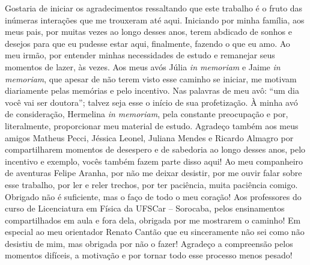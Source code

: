 

\begin{agradecimentos}
  Gostaria de iniciar os agradecimentos ressaltando que este trabalho é o fruto das inúmeras interações que me trouxeram até aqui. Iniciando por minha família, aos meus pais, por muitas vezes ao longo desses anos, terem abdicado de sonhos e desejos para que eu pudesse estar aqui, finalmente, fazendo o que eu amo. Ao meu irmão, por entender minhas necessidades de estudo e remanejar seus momentos de lazer, às vezes. Aos meus avós Júlia \textit{in memoriam} e Jaime \textit{in memoriam}, que apesar de não terem visto esse caminho se iniciar, me motivam diariamente pelas memórias e pelo incentivo. Nas palavras de meu avô: ``um dia você vai ser doutora''; talvez seja esse o início de sua profetização. À minha avó de consideração, Hermelina \textit{in memoriam}, pela constante preocupação e por, literalmente, proporcionar meu material de estudo.
  Agradeço também aos meus amigos Matheus Pecci, Jéssica Leonel, Juliana Mendes e Ricardo Almagro por compartilharem momentos de desespero e de sabedoria ao longo desses anos, pelo incentivo e exemplo, vocês também fazem parte disso aqui!
  Ao meu companheiro de aventuras Felipe Aranha, por não me deixar desistir, por me ouvir falar sobre esse trabalho, por ler e reler trechos, por ter paciência, muita paciência comigo. Obrigado não é suficiente, mas o faço de todo o meu coração!
  Aos professores do curso de Licenciatura em Física da UFSCar -- Sorocaba, pelos ensinamentos compartilhados em aula e fora dela, obrigada por me mostrarem o caminho! Em especial ao meu orientador Renato Cantão que eu sinceramente não sei como não desistiu de mim, mas obrigada por não o fazer! Agradeço a compreensão pelos momentos difíceis, a motivação e por tornar todo esse processo menos pesado!
\end{agradecimentos}

\cleardoublepage

